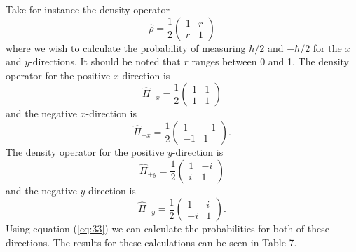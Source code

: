 \documentclass[twocolumn]{article}
\begin{document}
Take for instance the density operator
\begin{equation} \label{eq:34}
\hat{\rho}=\frac{1}{2}
\begin{pmatrix}
1 & r \\
r & 1
\end{pmatrix}
\end{equation}
where we wish to calculate the probability of measuring $\hbar/2$ and $-\hbar/2$ for the $x$ and $y$-directions. It should be noted that $r$ ranges between 0 and 1. The density operator for the positive $x$-direction is
\begin{equation} \label{eq:35}
\hat{\Pi}_{+x}=\frac{1}{2}
\begin{pmatrix}
1 & 1 \\
1 & 1
\end{pmatrix}
\end{equation}
and the negative $x$-direction is
\begin{equation} \label{eq:36}
\hat{\Pi}_{-x}=\frac{1}{2}
\begin{pmatrix}
1 & -1 \\
-1 & 1
\end{pmatrix}.
\end{equation}
The density operator for the positive $y$-direction is
\begin{equation} \label{eq:37}
\hat{\Pi}_{+y}=\frac{1}{2}
\begin{pmatrix}
1 & -i \\
i & 1
\end{pmatrix}
\end{equation}
and the negative $y$-direction is
\begin{equation} \label{eq:38}
\hat{\Pi}_{-y}=\frac{1}{2}
\begin{pmatrix}
1 & i \\
-i & 1
\end{pmatrix}.
\end{equation}
Using equation (\ref{eq:33}) we can calculate the probabilities for both of these directions. The results for these calculations can be seen in Table 7.
\end{document}

